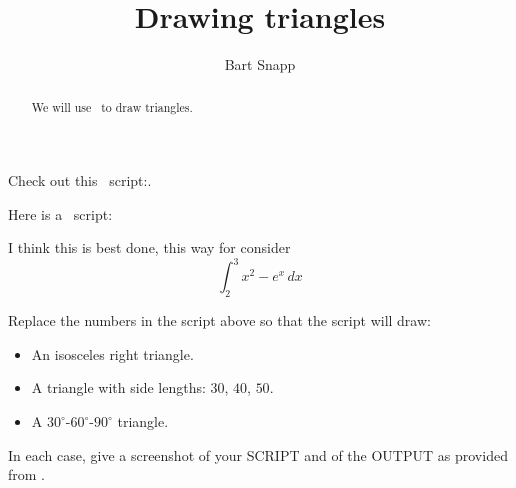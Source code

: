 \documentclass{ximera}
\title{Drawing triangles}
\author{Bart Snapp}
\begin{document}
\begin{abstract}
  We will use \snap\ to draw triangles.
\end{abstract}
\maketitle

\begin{question}
  Check out this \snap\ script:.
  \begin{scratch}
  \end{scratch}
\end{question}


\begin{question}
  Here is a \snap\ script:

      \begin{scratch}
    \end{scratch}
  
\begin{freeResponse}
  I think this is best done, this way for consider
  \[
  \int_2^3 x^2-e^x \, d x
  \]
\end{freeResponse}
\end{question}


\begin{question}
 Replace the numbers in the script above so that the script will draw:
 \begin{itemize}
 \item An isosceles right triangle.
 \item A triangle with side lengths: $30$, $40$, $50$.
 \item A $30^\circ$-$60^\circ$-$90^\circ$ triangle.
 \end{itemize}

 In each case, give a screenshot of your SCRIPT and of the OUTPUT as provided from \snap.
\end{question}
\end{document}
